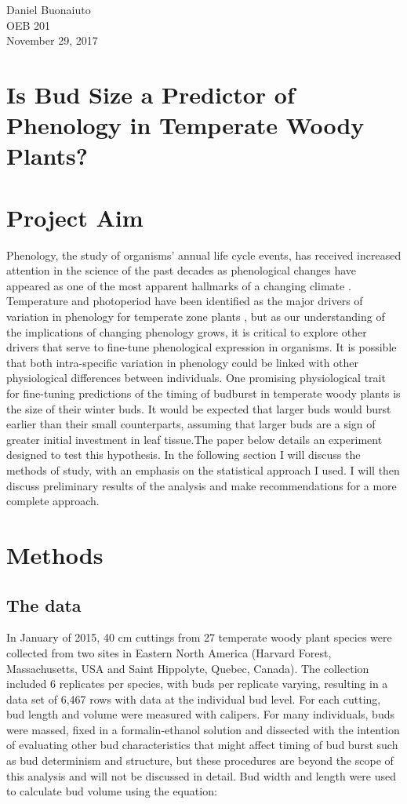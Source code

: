 \documentclass{article}\usepackage[]{graphicx}\usepackage[]{color}
\begin{document}
Daniel Buonaiuto\\
OEB 201\\
November 29, 2017
\section*{\textbf{Is Bud Size a Predictor of Phenology in Temperate Woody Plants?}}


\section*{Project Aim}
\par Phenology, the study of organisms' annual life cycle events, has received increased attention in the science of the past decades as phenological changes have appeared as one of the most apparent hallmarks of a changing climate \citep{Menzel2006}. Temperature and photoperiod have been identified as the major drivers of variation in phenology for temperate zone plants \citep{Forrest2010}, but as our understanding of the implications of changing phenology grows, it is critical to explore other drivers that serve to fine-tune phenological expression in organisms. It is possible that both intra-specific variation in phenology could be linked with other physiological differences between individuals. One promising physiological trait for fine-tuning predictions of the timing of budburst in temperate woody plants is the size of their winter buds. It would be expected that larger buds would burst earlier than their small counterparts, assuming that larger buds are a sign of greater initial investment in leaf tissue.The paper below details an experiment designed to test this hypothesis. In the following section I will discuss the methods of study, with an emphasis on the statistical approach I used. I will then discuss preliminary results of the analysis and make recommendations for a more complete approach.
\section*{Methods}
\subsection*{The data}
\par In January of 2015, 40 cm cuttings from 27 temperate woody plant species were collected from two sites in Eastern North America (Harvard Forest, Massachusetts, USA and Saint Hippolyte, Quebec, Canada). The collection included 6 replicates per species, with buds per replicate varying, resulting in a data set of 6,467 rows with data at the individual bud level. For each cutting, bud length and volume were measured with calipers. For many individuals, buds were massed, fixed in a formalin-ethanol solution and dissected with the intention of evaluating other bud characteristics that might affect timing of bud burst such as bud determinism and structure, but these procedures are beyond the scope of this analysis and will not be discussed in detail. Bud width and length were used to calculate bud volume using the equation:
\end{document}
